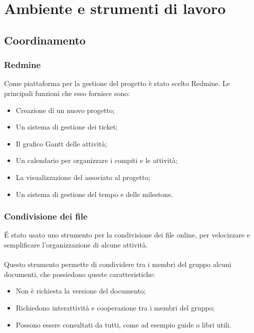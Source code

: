\newpage
\section{Ambiente e strumenti di lavoro}
\label{4.0}

\subsection{Coordinamento}
\label{}

\subsubsection{Redmine}
\label{4.1}
Come piattaforma per la gestione del progetto è stato scelto Redmine. Le principali funzioni che esso fornisce sono:
\begin{itemize}
\item Creazione di un nuovo progetto;
\item Un sistema di gestione dei ticket;
\item Il grafico Gantt delle attività;
\item Un calendario per organizzare i compiti e le attività;
\item La visualizzazione del  associato al progetto;
\item Un sistema di  gestione del tempo e delle milestone.
\end{itemize}



\subsubsection{Condivisione dei file}
\'E stato usato uno strumento per la condivisione dei file online, per velocizzare e semplificare l'organizzazione di alcune attività.

\paragraph{}
Questo strumento permette di condividere tra i membri del gruppo alcuni documenti, che possiedono queste caratteristiche:
\begin{itemize}
\item Non è richiesta la versione del documento;
\item Richiedono interattività e cooperazione tra i membri del gruppo;
\item Possono essere consultati da tutti, come ad esempio guide o libri utili.
\end{itemize}

